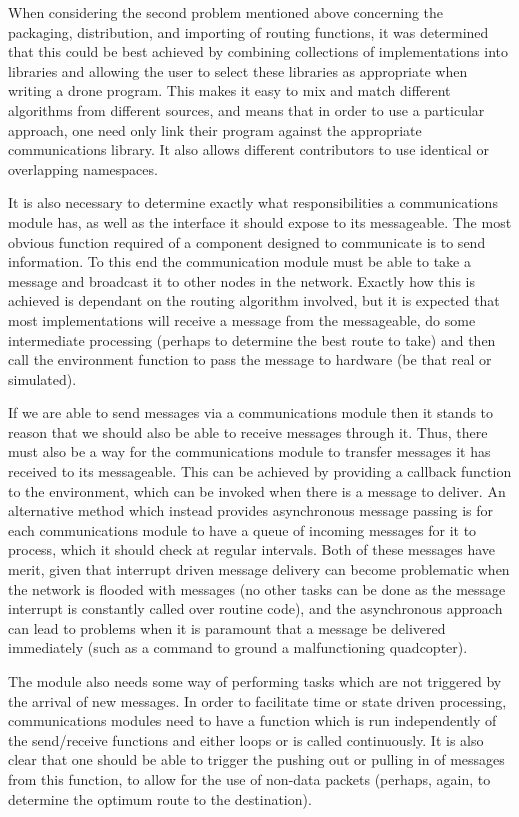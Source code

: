 When considering the second problem mentioned above concerning the packaging, distribution, and importing of routing functions, it was determined that this could be best achieved by combining collections of implementations into libraries and allowing the user to select these libraries as appropriate when writing a drone program. This makes it easy to mix and match different algorithms from different sources, and means that in order to use a particular approach, one need only link their program against the appropriate communications library. It also allows different contributors to use identical or overlapping namespaces.

It is also necessary to determine exactly what responsibilities a communications module has, as well as the interface it should expose to its messageable. The most obvious function required of a component designed to communicate is to send information. To this end the communication module must be able to take a message and broadcast it to other nodes in the network. Exactly how this is achieved is dependant on the routing algorithm involved, but it is expected that most implementations will receive a message from the messageable, do some intermediate processing (perhaps to determine the best route to take) and then call the environment function to pass the message to hardware (be that real or simulated).

If we are able to send messages via a communications module then it stands to reason that we should also be able to receive messages through it. Thus, there must also be a way for the communications module to transfer messages it has received to its messageable. This can be achieved by providing a callback function to the environment, which can be invoked when there is a message to deliver. An alternative method which instead provides asynchronous message passing is for each communications module to have a queue of incoming messages for it to process, which it should check at regular intervals. Both of these messages have merit, given that interrupt driven message delivery can become problematic when the network is flooded with messages (no other tasks can be done as the message interrupt is constantly called over routine code), and the asynchronous approach can lead to problems when it is paramount that a message be delivered immediately (such as a command to ground a malfunctioning quadcopter).

The module also needs some way of performing tasks which are not triggered by the arrival of new messages. In order to facilitate time or state driven processing, communications modules need to have a function which is run independently of the send/receive functions and either loops or is called continuously. It is also clear that one should be able to trigger the pushing out or pulling in of messages from this function, to allow for the use of non-data packets (perhaps, again, to determine the optimum route to the destination).

